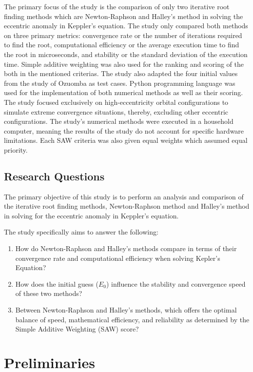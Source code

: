 \documentclass[a4paper,11pt]{article}
\begin{document}
The primary focus of the study is the comparison of only two iterative root finding methods which are Newton-Raphson and Halley's method in solving the eccentric anomaly in Keppler's equation. The study only compared both methods on three primary metrics: convergence rate or the number of iterations required to find the root, computational efficiency or the average execution time to find the root in microseconds, and stability or the standard deviation of the execution time. Simple additive weighting was also used for the ranking and scoring of the both in the mentioned criterias. The study also adapted the four initial values from the study of Ozuomba as test cases. Python programming language was used for the implementation of both numerical methods as well as their scoring.
The study focused exclusively on high-eccentricity orbital configurations to simulate extreme convergence situations, thereby, excluding other eccentric configurations. The study's numerical methods were executed in a household computer, meaning the results of the study do not account for specific hardware limitations. Each SAW criteria was also given equal weights which assumed equal priority. 

\subsection{Research Questions}

	The primary objective of this study is to perform an analysis and comparison of the iterative root finding methods, Newton-Raphson method and Halley's method in solving for the eccentric anomaly in Keppler's equation. 

The study specifically aims to answer the following:
\begin{enumerate}
    \item How do Newton-Raphson and Halley's methods compare in terms of their convergence rate and computational efficiency when solving Kepler's Equation?
    \item How does the initial guess ($E_0$) influence the stability and convergence speed of these two methods?
    \item Between Newton-Raphson and Halley's methods, which offers the optimal balance of speed, mathematical efficiency, and reliability as determined by the Simple Additive Weighting (SAW) score?
\end{enumerate}


\section{Preliminaries}
\end{document}
